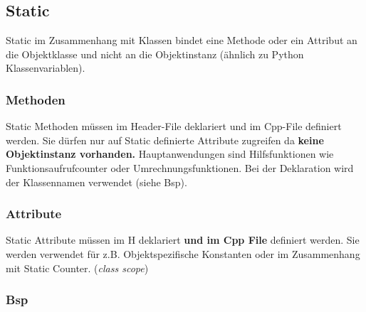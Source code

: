 
\subsection{Static} 

Static im Zusammenhang mit Klassen bindet eine Methode oder ein Attribut an die Objektklasse und nicht an die Objektinstanz (ähnlich zu Python Klassenvariablen).


\subsubsection{Methoden}

Static Methoden müssen im Header-File deklariert und im Cpp-File definiert werden. 
Sie dürfen nur auf Static definierte Attribute zugreifen da \textbf{keine Objektinstanz vorhanden.} 
Hauptanwendungen sind Hilfsfunktionen wie Funktionsaufrufcounter oder Umrechnungsfunktionen. 
Bei der Deklaration wird der Klassennamen verwendet (siehe Bsp). 

\subsubsection{Attribute}

Static Attribute müssen im H deklariert \textbf{und im Cpp File} definiert werden. 
Sie werden verwendet für z.B. Objektspezifische Konstanten oder im Zusammenhang mit Static Counter. 
(\textit{class scope})

\subsubsection{Bsp}

